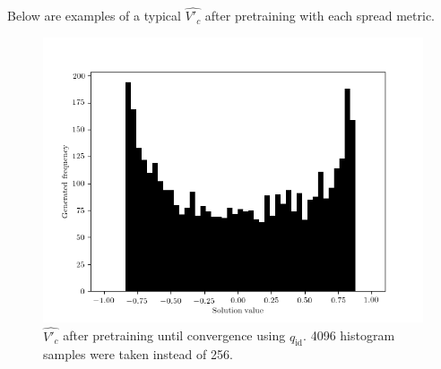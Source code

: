 \documentclass[../../main.tex]{subfiles}
\begin{document}
Below are examples of a typical $\hat{V'_c}$ after pretraining with each spread metric.
\begin{figure}[H]
    \begin{center}
    \includegraphics[width=\textwidth]{identitySpread}
    \caption[Generator after $q_\text{id}$ pretraining]{
        $\hat{V'_c}$ after pretraining until convergence using $q_\text{id}$.
        4096 histogram samples were taken instead of 256.
    }
    \label{fig:identitySpread}
    \end{center}
\end{figure}
\end{document}

